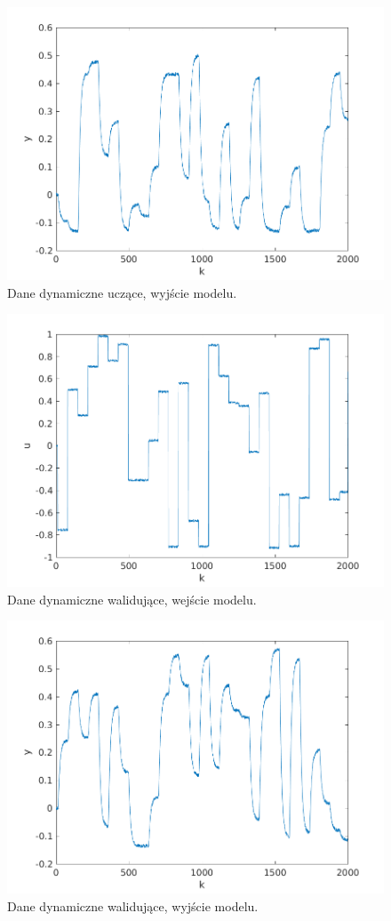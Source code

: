 \documentclass{article}
\begin{document}
\begin{figure}
	\centering
	\includegraphics[width=0.7\linewidth]{../dane_dynamiczne/dane_dyn_ucz_y}
	\caption{Dane dynamiczne uczące, wyjście modelu.}
	\label{fig:dane_dyn_ucz_y}
\end{figure}

\begin{figure}
	\centering
	\includegraphics[width=0.7\linewidth]{../dane_dynamiczne/dane_dyn_wer_u}
	\caption{Dane dynamiczne walidujące, wejście modelu.}
	\label{fig:dane_dyn_wer_u}
\end{figure}

\begin{figure}
	\centering
	\includegraphics[width=0.7\linewidth]{../dane_dynamiczne/dane_dyn_wer_y}
	\caption{Dane dynamiczne walidujące, wyjście modelu.}
	\label{fig:dane_dyn_wer_y}
\end{figure}
\end{document}
